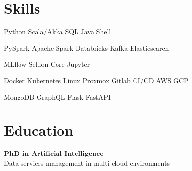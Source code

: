 \documentclass[]{plushcv}
\begin{document}
\begin{minipage}[t]{0.23\textwidth}


\section{Skills}
\sectionsep
{}
Python \textbullet{} Scala/Akka \textbullet{} SQL \textbullet{} Java \textbullet{} Shell \\
\sectionsep

PySpark \textbullet{} Apache Spark \textbullet{} Databricks \textbullet{} Kafka \textbullet{} Elasticsearch \\
\sectionsep

MLflow \textbullet{} Seldon Core \textbullet{} Jupyter \\
\sectionsep

Docker \textbullet{} Kubernetes \textbullet{} Linux \textbullet{} Proxmox \textbullet{} Gitlab CI/CD \textbullet{} AWS \textbullet{} GCP \\
\sectionsep

MongoDB \textbullet{} GraphQL \textbullet{} Flask \textbullet{} FastAPI \\

\sectionsep


\section{Education}
\sectionsep
\sectionsep

\textbf{PhD in Artificial Intelligence} \\
Data services management in multi-cloud environments \\


\end{minipage}
\end{document}
